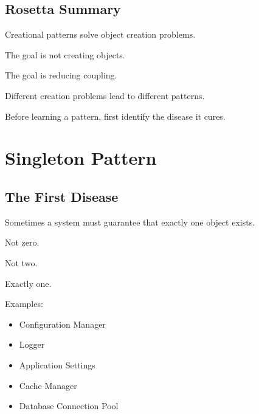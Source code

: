\documentclass[11pt,a4paper]{book}
\begin{document}
\section{Rosetta Summary}

\begin{rosettarule}

Creational patterns solve object creation problems.

\end{rosettarule}

\begin{rosettarule}

The goal is not creating objects.

The goal is reducing coupling.

\end{rosettarule}

\begin{rosettarule}

Different creation problems lead to different patterns.

\end{rosettarule}

\begin{rosettarule}

Before learning a pattern,
first identify the disease it cures.

\end{rosettarule}
\chapter{Singleton Pattern}

\section{The First Disease}

\begin{idea}

Sometimes a system must guarantee that exactly one
object exists.

Not zero.

Not two.

Exactly one.

\end{idea}

Examples:

\begin{itemize}

\item Configuration Manager
\item Logger
\item Application Settings
\item Cache Manager
\item Database Connection Pool

\end{itemize}
\end{document}
